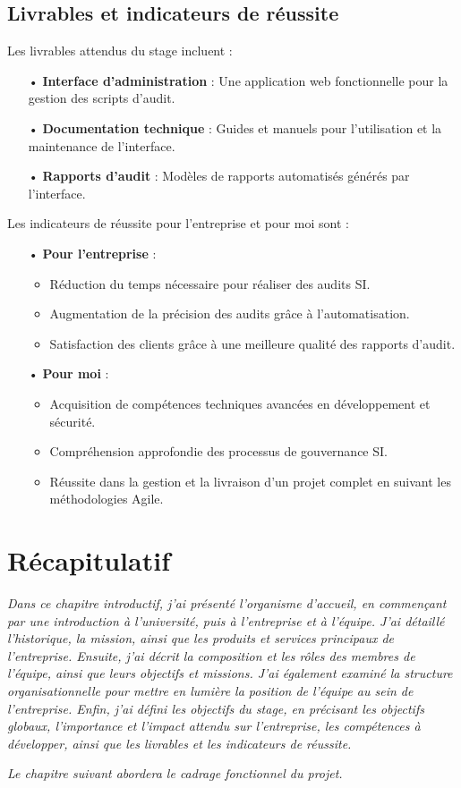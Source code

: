 \subsection{Livrables et indicateurs de réussite}
Les livrables attendus du stage incluent :
\begin{itemize}
    \item[•] \textbf{Interface d'administration} : Une application web fonctionnelle pour la gestion des scripts d'audit.
    \item[•] \textbf{Documentation technique} : Guides et manuels pour l'utilisation et la maintenance de l'interface.
    \item[•] \textbf{Rapports d'audit} : Modèles de rapports automatisés générés par l'interface.
\end{itemize}

Les indicateurs de réussite pour l'entreprise et pour moi sont :
\begin{itemize}
    \item[•] \textbf{Pour l'entreprise} :
    \begin{itemize}
        \item Réduction du temps nécessaire pour réaliser des audits SI.
        \item Augmentation de la précision des audits grâce à l'automatisation.
        \item Satisfaction des clients grâce à une meilleure qualité des rapports d'audit.
    \end{itemize}
    \item[•] \textbf{Pour moi} :
    \begin{itemize}
        \item Acquisition de compétences techniques avancées en développement et sécurité.
        \item Compréhension approfondie des processus de gouvernance SI.
        \item Réussite dans la gestion et la livraison d'un projet complet en suivant les méthodologies Agile.
    \end{itemize}
\end{itemize}

\newpage

\section{Récapitulatif}
\textit{Dans ce chapitre introductif, j'ai présenté l'organisme d'accueil, en commençant par une introduction à l'université, puis à l'entreprise et à l'équipe. J'ai détaillé l'historique, la mission, ainsi que les produits et services principaux de l'entreprise. Ensuite, j'ai décrit la composition et les rôles des membres de l'équipe, ainsi que leurs objectifs et missions. J'ai également examiné la structure organisationnelle pour mettre en lumière la position de l'équipe au sein de l'entreprise. Enfin, j'ai défini les objectifs du stage, en précisant les objectifs globaux, l'importance et l'impact attendu sur l'entreprise, les compétences à développer, ainsi que les livrables et les indicateurs de réussite.}

\textit{Le chapitre suivant abordera le cadrage fonctionnel du projet.}
